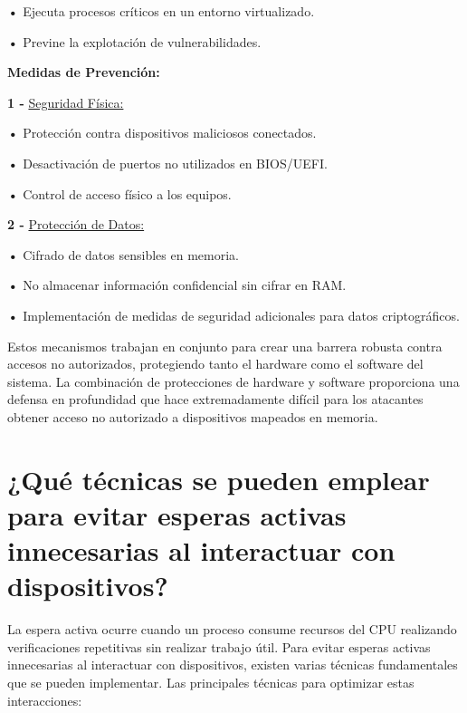 \documentclass{article}
\begin{document}
\textbf{    •} { Ejecuta procesos críticos en un entorno virtualizado.}

\textbf{    •} { Previne la explotación de vulnerabilidades.}




 
\quad

\textbf{Medidas de Prevención: }

\quad

\textbf{1 -  } {\underline{Seguridad Física: }}

\quad

\textbf{    •} { Protección contra dispositivos maliciosos conectados.}

\textbf{    •} { Desactivación de puertos no utilizados en BIOS/UEFI.}

\textbf{    •} { Control de acceso físico a los equipos.}


\quad

\textbf{2 -  } {\underline{Protección de Datos: }}

\quad

\textbf{    •} { Cifrado de datos sensibles en memoria.}

\textbf{    •} { No almacenar información confidencial sin cifrar en RAM.}

\textbf{    •} { Implementación de medidas de seguridad adicionales para datos criptográficos.}

\quad

{Estos mecanismos trabajan en conjunto para crear una barrera robusta contra accesos no autorizados, protegiendo tanto el hardware como el software del sistema. La combinación de protecciones de hardware y software proporciona una defensa en profundidad que hace extremadamente difícil para los atacantes obtener acceso no autorizado a dispositivos mapeados en memoria.}

\quad
\newpage





\section{¿Qué técnicas se pueden emplear para evitar esperas activas innecesarias al interactuar con dispositivos?}

\quad

{ La espera activa ocurre cuando un proceso consume recursos del CPU realizando verificaciones repetitivas sin realizar trabajo útil. Para evitar esperas activas innecesarias al interactuar con dispositivos, existen varias técnicas fundamentales que se pueden implementar. Las principales técnicas para optimizar estas interacciones: }
\end{document}
